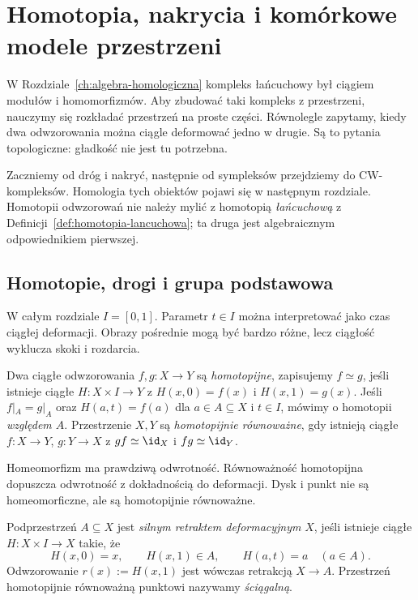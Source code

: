\chapter{Homotopia, nakrycia i komórkowe modele przestrzeni}
\label{ch:topologia-algebraiczna-podstawy}

W Rozdziale~\ref{ch:algebra-homologiczna} kompleks łańcuchowy
był ciągiem modułów i homomorfizmów. Aby zbudować taki
kompleks z przestrzeni, nauczymy się rozkładać przestrzeń
na proste części. Równolegle zapytamy, kiedy dwa odwzorowania
można ciągle deformować jedno w drugie. Są to pytania
topologiczne: gładkość nie jest tu potrzebna.

Zaczniemy od dróg i nakryć, następnie od sympleksów
przejdziemy do CW-kompleksów. Homologia tych obiektów
pojawi się w następnym rozdziale. Homotopii odwzorowań
nie należy mylić z homotopią \emph{łańcuchową}
z Definicji~\ref{def:homotopia-lancuchowa};
ta druga jest algebraicznym odpowiednikiem pierwszej.

\section{Homotopie, drogi i grupa podstawowa}
\label{sec:homotopie-pi1}

W całym rozdziale $I=[0,1]$. Parametr $t\in I$
można interpretować jako czas ciągłej deformacji.
Obrazy pośrednie mogą być bardzo różne, lecz
ciągłość wyklucza skoki i rozdarcia.

\begin{definicja}
\label{def:homotopia-topologiczna}
Dwa ciągłe odwzorowania $f,g:X\to Y$ są
\emph{homotopijne}, zapisujemy $f\simeq g$,
jeśli istnieje ciągłe $H:X\times I\to Y$ z
$H(x,0)=f(x)$ i $H(x,1)=g(x)$.
Jeśli $f|_A=g|_A$ oraz $H(a,t)=f(a)$
dla $a\in A\subseteq X$ i $t\in I$,
mówimy o homotopii \emph{względem $A$}.
Przestrzenie $X,Y$ są \emph{homotopijnie
równoważne}, gdy istnieją ciągłe $f:X\to Y$,
$g:Y\to X$ z $gf\simeq\id_X$ i
$fg\simeq\id_Y$.
\end{definicja}

Homeomorfizm ma prawdziwą odwrotność.
Równoważność homotopijna dopuszcza odwrotność
z dokładnością do deformacji. Dysk i punkt
nie są homeomorficzne, ale są homotopijnie
równoważne.

\begin{definicja}
\label{def:retrakt-deformacyjny}
Podprzestrzeń $A\subseteq X$ jest
\emph{silnym retraktem deformacyjnym} $X$,
jeśli istnieje ciągłe $H:X\times I\to X$ takie, że
\[
 H(x,0)=x,\qquad H(x,1)\in A,\qquad
 H(a,t)=a\quad(a\in A).
\]
Odwzorowanie $r(x):=H(x,1)$ jest wówczas
retrakcją $X\to A$. Przestrzeń homotopijnie
równoważną punktowi nazywamy \emph{ściągalną}.
\end{definicja}

